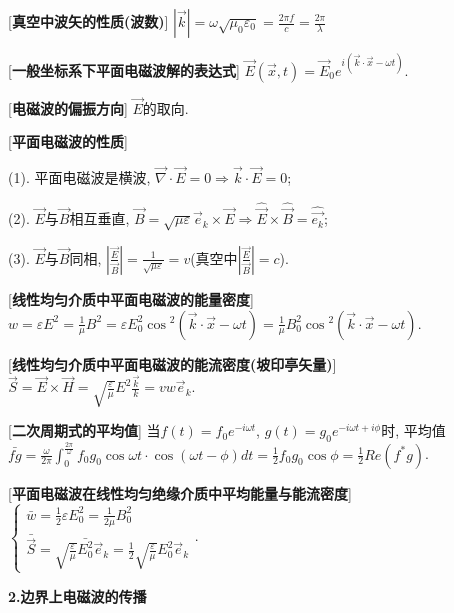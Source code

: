 [\textbf{真空中波矢的性质(波数)}] $|\vec k|=\omega\sqrt{\mu_0\varepsilon_0}=\frac{2\pi f}{c}=\frac{2\pi}{\lambda}$

[\textbf{一般坐标系下平面电磁波解的表达式}] $\vec E(\vec x, t)=\vec E_0e^{i(\vec k\cdot\vec x-\omega t)}$.\par

[\textbf{电磁波的偏振方向}] $\vec E$的取向.\par

[\textbf{平面电磁波的性质}]\par
\qquad (1). 平面电磁波是横波, $\vec\nabla\cdot\vec E=0\Rightarrow \vec k\cdot\vec E=0$;\par
\qquad (2). $\vec E$与$\vec B$相互垂直, $\vec B=\sqrt{\mu\varepsilon}\vec e_k\times\vec E\Rightarrow \hat{\vec E}\times\hat{\vec B}=\hat{\vec{e_k}}$;\par
\qquad (3). $\vec E$与$\vec B$同相, $\left|\frac{\vec E}{\vec B}\right|=\frac{1}{\sqrt{\mu\varepsilon}}=v$(真空中$\left|\frac{\vec E}{\vec B}\right|=c$).\par

[\textbf{线性均匀介质中平面电磁波的能量密度}] $w=\varepsilon E^2=\frac{1}{\mu}B^2=\varepsilon E_0^2\cos{^2(\vec k\cdot\vec x-\omega t)}=\frac{1}{\mu}B_0^2\cos{^2(\vec k\cdot\vec x-\omega t)}$.\par

[\textbf{线性均匀介质中平面电磁波的能流密度(坡印亭矢量)}] $\vec S=\vec E\times\vec H=\sqrt{\frac{\varepsilon}{\mu}}E^2\frac{\vec k}{k}=vw\vec e_k$.\par

[\textbf{二次周期式的平均值}] 当$f(t)=f_0e^{-i\omega t}$, $g(t)=g_0e^{-i\omega t+i\phi}$时, 平均值\\$\bar{fg}=\frac{\omega}{2\pi}\int_0^{\frac{2\pi}{\omega}}f_0g_0\cos{\omega t}\cdot\cos{(\omega t-\phi)}dt=\frac{1}{2}f_0g_0\cos\phi=\frac{1}{2}Re(f^*g)$.\par

[\textbf{平面电磁波在线性均匀绝缘介质中平均能量与能流密度}] $\begin{cases}\bar w=\frac{1}{2}\varepsilon E_0^2=\frac{1}{2\mu}B_0^2\\ \bar{\vec S}=\sqrt{\frac{\varepsilon}{\mu}}\bar{E_0^2}\vec e_k=\frac{1}{2}\sqrt{\frac{\varepsilon}{\mu}}E_0^2\vec e_k\end{cases}$.\par

\clearpage

\large 
\begin{center}
 \textbf{2.边界上电磁波的传播}
\end{center}

